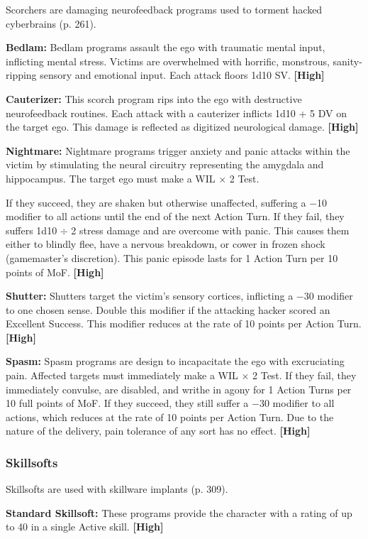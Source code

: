 Scorchers are damaging neurofeedback programs used to torment hacked cyberbrains (p. 261). 

\textbf{Bedlam:} Bedlam programs assault the ego with traumatic mental input, inflicting mental stress. Victims are overwhelmed with horrific, monstrous, sanity-ripping sensory and emotional input. Each attack floors 1d10 SV. \textbf{[High]} 

\textbf{Cauterizer:} This scorch program rips into the ego with destructive neurofeedback routines. Each attack with a cauterizer inflicts 1d10 + 5 DV on the target ego. This damage is reflected as digitized neurological damage. \textbf{[High]} 

\textbf{Nightmare:} Nightmare programs trigger anxiety and panic attacks within the victim by stimulating the neural circuitry representing the amygdala and hippocampus. The target ego must make a WIL $\times$ 2 Test. 

If they succeed, they are shaken but otherwise unaffected, suffering a $-$10 modifier to all actions until the end of the next Action Turn. If they fail, they suffers 1d10 $\div$ 2 stress damage and are overcome with panic. This causes them either to blindly flee, have a nervous breakdown, or cower in frozen shock (gamemaster’s discretion). This panic episode lasts for 1 Action Turn per 10 points of MoF. \textbf{[High]} 

\textbf{Shutter:} Shutters target the victim’s sensory cortices, inflicting a $-$30 modifier to one chosen sense. Double this modifier if the attacking hacker scored an Excellent Success. This modifier reduces at the rate of 10 points per Action Turn. \textbf{[High]} 

\textbf{Spasm:} Spasm programs are design to incapacitate the ego with excruciating pain. Affected targets must immediately make a WIL $\times$ 2 Test. If they fail, they immediately convulse, are disabled, and writhe in agony for 1 Action Turns per 10 full points of MoF. If they succeed, they still suffer a $-$30 modifier to all actions, which reduces at the rate of 10 points per Action Turn. Due to the nature of the delivery, pain tolerance of any sort has no effect. \textbf{[High]} 

\subsubsection{Skillsofts} 

Skillsofts are used with skillware implants (p. 309). 

\textbf{Standard Skillsoft:} These programs provide the character with a rating of up to 40 in a single Active skill. \textbf{[High]} 

